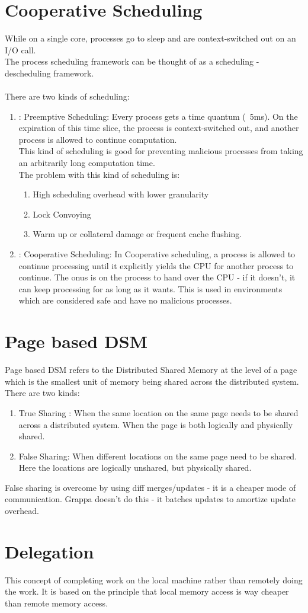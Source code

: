 \documentclass[twoside]{article}
\begin{document}
\section{Cooperative Scheduling}
While on a single core, processes go to sleep and are context-switched out on an I/O call. \\
The process scheduling framework can be thought of as a scheduling - descheduling framework. \\ \\ 
There are two kinds of scheduling: 
\begin{enumerate}
\item: Preemptive Scheduling: Every process gets a time quantum (~5ms). On the expiration of this time slice, the process is context-switched out, and another process is allowed to continue computation. \\
This kind of scheduling is good for preventing malicious processes from taking an arbitrarily long computation time. \\
The problem with this kind of scheduling is: 
\begin{enumerate}
\item High scheduling overhead with lower granularity
\item Lock Convoying
\item Warm up or collateral damage or frequent cache flushing.
\end{enumerate} 
\item: Cooperative Scheduling: In Cooperative scheduling, a process is allowed to continue processing until it explicitly yields the CPU for another process to continue. The onus is on the process to hand over the CPU - if it doesn't, it can keep processing for as long as it wants. This is used in environments which are considered safe and have no malicious processes.
\end{enumerate}

\section{Page based DSM}
Page based DSM refers to the Distributed Shared Memory at the level of a page which is the smallest unit of memory being shared across the distributed system. There are two kinds: 
\begin{enumerate}
\item True Sharing : When the same location on the same page needs to be shared across a distributed system. When the page is both logically and physically shared.
\item False Sharing: When different locations on the same page need to be shared. Here the locations are logically unshared, but physically shared.
\end{enumerate}
False sharing is overcome by using diff merges/updates - it is a cheaper mode of communication.
Grappa doesn't do this - it batches updates to amortize update overhead.

\section{Delegation}
This concept of completing work on the local machine rather than remotely doing the work. It is based on the principle that local memory access is way cheaper than remote memory access. 
\end{document}
